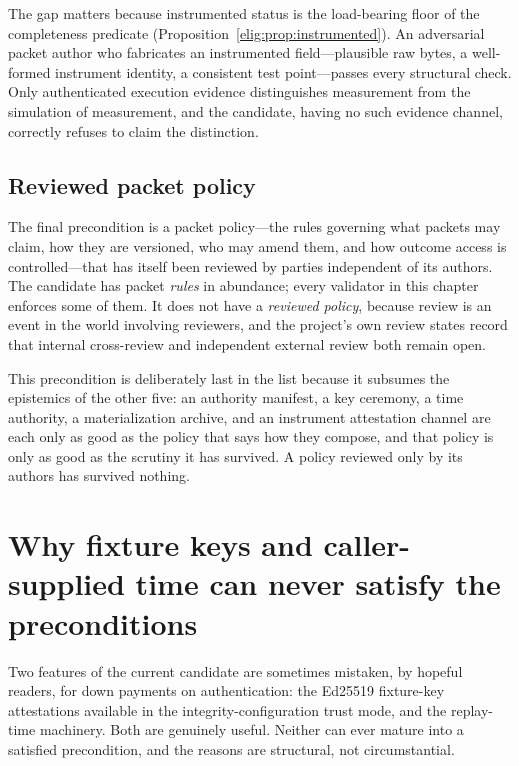 The gap matters because instrumented status is the load-bearing floor of the completeness predicate (Proposition~\ref{elig:prop:instrumented}). An adversarial packet author who fabricates an instrumented field---plausible raw bytes, a well-formed instrument identity, a consistent test point---passes every structural check. Only authenticated execution evidence distinguishes measurement from the simulation of measurement, and the candidate, having no such evidence channel, correctly refuses to claim the distinction.

\subsection{Reviewed packet policy}\label{elig:sec:policy}

The final precondition is a packet policy---the rules governing what packets may claim, how they are versioned, who may amend them, and how outcome access is controlled---that has itself been reviewed by parties independent of its authors. The candidate has packet \emph{rules} in abundance; every validator in this chapter enforces some of them. It does not have a \emph{reviewed policy}, because review is an event in the world involving reviewers, and the project's own review states record that internal cross-review and independent external review both remain open.

This precondition is deliberately last in the list because it subsumes the epistemics of the other five: an authority manifest, a key ceremony, a time authority, a materialization archive, and an instrument attestation channel are each only as good as the policy that says how they compose, and that policy is only as good as the scrutiny it has survived. A policy reviewed only by its authors has survived nothing.

\section{Why fixture keys and caller-supplied time can never satisfy the preconditions}\label{elig:sec:fixturekeys}

Two features of the current candidate are sometimes mistaken, by hopeful readers, for down payments on authentication: the Ed25519 fixture-key attestations available in the integrity-configuration trust mode, and the replay-time machinery. Both are genuinely useful. Neither can ever mature into a satisfied precondition, and the reasons are structural, not circumstantial.


